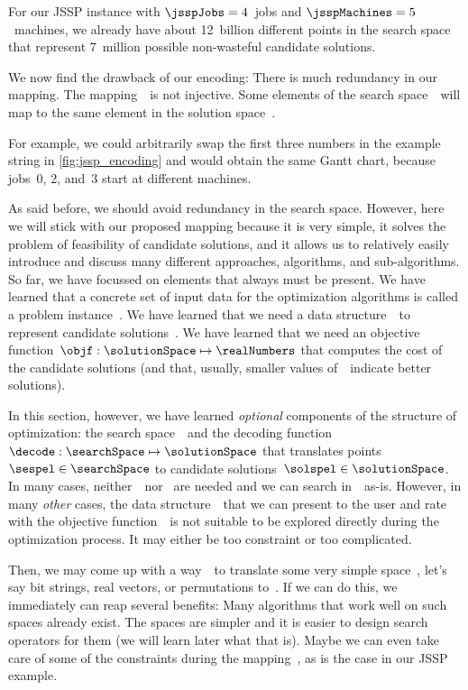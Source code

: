 For our  \gls{JSSP} instance with $\jsspJobs=4$~jobs and $\jsspMachines=5$~machines, we already have about 12~billion different points in the search space that represent 7~million possible non-wasteful candidate solutions.

We now find the drawback of our encoding:
There is much redundancy in our mapping.
The mapping~\decode\ is not injective.
Some elements of the search space~\searchSpace\ will map to the same element in the solution space~\solutionSpace.

For example, we could arbitrarily swap the first three numbers in the example string in \autoref{fig:jssp_encoding} and would obtain the same Gantt chart, because jobs~0, 2, and~3 start at different machines.

As said before, we should avoid redundancy in the search space.
However, here we will stick with our proposed mapping because it is very simple, it solves the problem of feasibility of candidate solutions, and it allows us to relatively easily introduce and discuss many different approaches, algorithms, and sub-algorithms.%
\endhsection%
\endhsection%
%
%
So far, we have focussed on elements that always must be present.
We have learned that a concrete set of input data for the optimization algorithms is called a problem instance~\instance.
We have learned that we need a data structure~\solutionSpace\ to represent candidate solutions~\solspel.
We have learned that we need an objective function~$\objf:\solutionSpace\mapsto\realNumbers$ that computes the cost of the candidate solutions (and that, usually, smaller values of~\objf\ indicate better solutions).

In this section, however, we have learned \emph{optional} components of the structure of optimization: the search space~\searchSpace\ and the decoding function~$\decode:\searchSpace\mapsto\solutionSpace$ that translates points~$\sespel\in\searchSpace$ to candidate solutions~$\solspel\in\solutionSpace$.
In many cases, neither~\searchSpace\ nor \decode\ are needed and we can search in~\solutionSpace\ as-is.
However, in many \emph{other} cases, the data structure~\solutionSpace\ that we can present to the user and rate with the objective function~\objf\ is not suitable to be explored directly during the optimization process.
It may either be too constraint or too complicated.

Then, we may come up with a way~\decode\ to translate some very simple space~\searchSpace, let's say bit strings, real vectors, or permutations to~\solutionSpace.
If we can do this, we immediately can reap several benefits:
Many algorithms that work well on such spaces already exist.
The spaces are simpler and it is easier to design search operators for them (we will learn later what that is).
Maybe we can even take care of some of the constraints during the mapping~\decode, as is the case in our \gls{JSSP} example.

